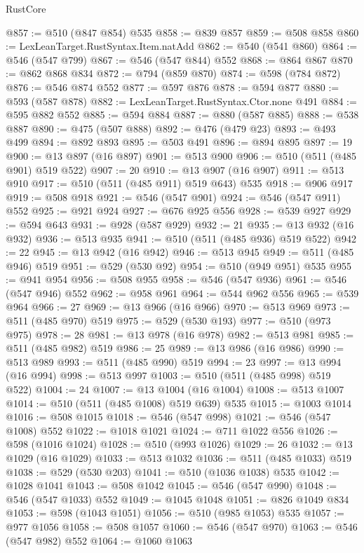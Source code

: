 \begin{lexlean}{RustCore}
\begin{coremodule}
@857 := @510 (@847 @854) @535
@858 := @839 @857
@859 := @508 @858
@860 := LexLeanTarget.RustSyntax.Item.natAdd
@862 := @540 (@541 @860)
@864 := @546 (@547 @799)
@867 := @546 (@547 @844) @552
@868 := @864 @867
@870 := @862 @868 @834
@872 := @794 (@859 @870)
@874 := @598 (@784 @872)
@876 := @546 @874 @552
@877 := @597 @876
@878 := @594 @877
@880 := @593 (@587 @878)
@882 := LexLeanTarget.RustSyntax.Ctor.none @491
@884 := @595 @882 @552
@885 := @594 @884
@887 := @880 (@587 @885)
@888 := @538 @887
@890 := @475 (@507 @888)
@892 := @476 (@479 @23)
@893 := @493 @499
@894 := @892 @893
@895 := @503 @491
@896 := @894 @895
@897 := 19
@900 := @13 @897 (@16 @897)
@901 := @513 @900
@906 := @510 (@511 (@485 @901) @519 @522)
@907 := 20
@910 := @13 @907 (@16 @907)
@911 := @513 @910
@917 := @510 (@511 (@485 @911) @519 @643) @535
@918 := @906 @917
@919 := @508 @918
@921 := @546 (@547 @901)
@924 := @546 (@547 @911) @552
@925 := @921 @924
@927 := @676 @925 @556
@928 := @539 @927
@929 := @594 @643
@931 := @928 (@587 @929)
@932 := 21
@935 := @13 @932 (@16 @932)
@936 := @513 @935
@941 := @510 (@511 (@485 @936) @519 @522)
@942 := 22
@945 := @13 @942 (@16 @942)
@946 := @513 @945
@949 := @511 (@485 @946) @519
@951 := @529 (@530 @92)
@954 := @510 (@949 @951) @535
@955 := @941 @954
@956 := @508 @955
@958 := @546 (@547 @936)
@961 := @546 (@547 @946) @552
@962 := @958 @961
@964 := @544 @962 @556
@965 := @539 @964
@966 := 27
@969 := @13 @966 (@16 @966)
@970 := @513 @969
@973 := @511 (@485 @970) @519
@975 := @529 (@530 @193)
@977 := @510 (@973 @975)
@978 := 28
@981 := @13 @978 (@16 @978)
@982 := @513 @981
@985 := @511 (@485 @982) @519
@986 := 25
@989 := @13 @986 (@16 @986)
@990 := @513 @989
@993 := @511 (@485 @990) @519
@994 := 23
@997 := @13 @994 (@16 @994)
@998 := @513 @997
@1003 := @510 (@511 (@485 @998) @519 @522)
@1004 := 24
@1007 := @13 @1004 (@16 @1004)
@1008 := @513 @1007
@1014 := @510 (@511 (@485 @1008) @519 @639) @535
@1015 := @1003 @1014
@1016 := @508 @1015
@1018 := @546 (@547 @998)
@1021 := @546 (@547 @1008) @552
@1022 := @1018 @1021
@1024 := @711 @1022 @556
@1026 := @598 (@1016 @1024)
@1028 := @510 (@993 @1026)
@1029 := 26
@1032 := @13 @1029 (@16 @1029)
@1033 := @513 @1032
@1036 := @511 (@485 @1033) @519
@1038 := @529 (@530 @203)
@1041 := @510 (@1036 @1038) @535
@1042 := @1028 @1041
@1043 := @508 @1042
@1045 := @546 (@547 @990)
@1048 := @546 (@547 @1033) @552
@1049 := @1045 @1048
@1051 := @826 @1049 @834
@1053 := @598 (@1043 @1051)
@1056 := @510 (@985 @1053) @535
@1057 := @977 @1056
@1058 := @508 @1057
@1060 := @546 (@547 @970)
@1063 := @546 (@547 @982) @552
@1064 := @1060 @1063

\end{coremodule}
\end{lexlean}
